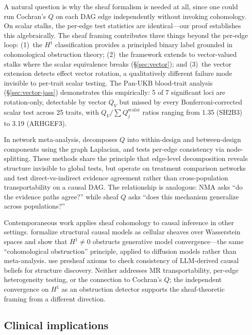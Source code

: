 \documentclass[11pt]{article}
\begin{document}
A natural question is why the sheaf formalism is needed at all, since one could run Cochran's $Q$ on each DAG edge independently without invoking cohomology.
On scalar stalks, the per-edge test statistics are identical---our proof establishes this algebraically.
The sheaf framing contributes three things beyond the per-edge loop: (1)~the $H^1$ classification provides a principled binary label grounded in cohomological obstruction theory; (2)~the framework extends to vector-valued stalks where the scalar equivalence breaks (\S\ref{sec:vector}); and (3)~the vector extension detects effect vector rotation, a qualitatively different failure mode invisible to per-trait scalar testing. The Pan-UKB blood-trait analysis (\S\ref{sec:vector-jass}) demonstrates this empirically: 5 of 7 significant loci are rotation-only, detectable by vector $Q_V$ but missed by every Bonferroni-corrected scalar test across 25 traits, with $Q_V / \sum Q_j^{\mathrm{scalar}}$ ratios ranging from 1.35 (SH2B3) to 3.19 (ARHGEF3).

In network meta-analysis, \citet{rucker2012network} decomposes $Q$ into within-design and between-design components using the graph Laplacian, and \citet{dias2010checking} tests per-edge consistency via node-splitting.
These methods share the principle that edge-level decomposition reveals structure invisible to global tests, but operate on treatment comparison networks and test direct-vs-indirect evidence agreement rather than cross-population transportability on a causal DAG.
The relationship is analogous: NMA asks ``do the evidence paths agree?'' while sheaf $Q$ asks ``does this mechanism generalize across populations?''

Contemporaneous work applies sheaf cohomology to causal inference in other settings.
\citet{wu2026sheafcausal} formalize structural causal models as cellular sheaves over Wasserstein spaces and show that $H^1 \neq 0$ obstructs generative model convergence---the same ``cohomological obstruction'' principle, applied to diffusion models rather than meta-analysis.
\citet{kim2025holograph} use presheaf axioms to check consistency of LLM-derived causal beliefs for structure discovery.
Neither addresses MR transportability, per-edge heterogeneity testing, or the connection to Cochran's $Q$; the independent convergence on $H^1$ as an obstruction detector supports the sheaf-theoretic framing from a different direction.

\subsection{Clinical implications}
\end{document}

